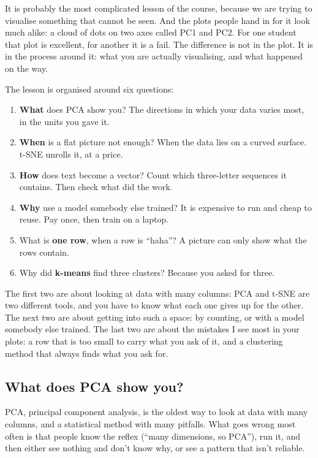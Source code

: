 \documentclass[12pt, a4paper]{article}
\theoremstyle{definition}
\theoremstyle{remark}
\begin{document}
It is probably the most complicated lesson of the course, because we are trying to visualise something that cannot be seen. And the plots people hand in for it look much alike: a cloud of dots on two axes called PC1 and PC2. For one student that plot is excellent, for another it is a fail. The difference is not in the plot. It is in the process around it: what you are actually visualising, and what happened on the way.

The lesson is organised around six questions:

\begin{enumerate}
\item \textbf{What} does PCA show you? The directions in which your data varies most, in the units you gave it.
\item \textbf{When} is a flat picture not enough? When the data lies on a curved surface. t-SNE unrolls it, at a price.
\item \textbf{How} does text become a vector? Count which three-letter sequences it contains. Then check what did the work.
\item \textbf{Why} use a model somebody else trained? It is expensive to run and cheap to reuse. Pay once, then train on a laptop.
\item What is \textbf{one row}, when a row is ``haha''? A picture can only show what the rows contain.
\item Why did \textbf{k-means} find three clusters? Because you asked for three.
\end{enumerate}

The first two are about looking at data with many columns: PCA and t-SNE are two different tools, and you have to know what each one gives up for the other. The next two are about getting into such a space: by counting, or with a model somebody else trained. The last two are about the mistakes I see most in your plots: a row that is too small to carry what you ask of it, and a clustering method that always finds what you ask for.

\subsection{What does PCA show you?}
\label{sec:pca}
PCA, principal component analysis, is the oldest way to look at data with many columns, and a statistical method with many pitfalls. What goes wrong most often is that people know the reflex (``many dimensions, so PCA''), run it, and then either see nothing and don't know why, or see a pattern that isn't reliable.
\end{document}
